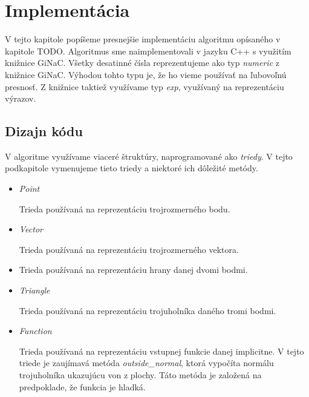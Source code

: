 \chapter{Implementácia}
\label{kap:implemetation}

V tejto kapitole popíšeme presnejšie implementáciu algoritmu opísaného v kapitole TODO.
Algoritmus sme naimplementovali v jazyku C++ s využitím knižnice GiNaC. Všetky desatinné čísla
reprezentujeme ako typ \textit{numeric} z knižnice GiNaC. Výhodou tohto typu je, že ho vieme 
používať na ľubovoľnú presnosť. Z knižnice taktiež využívame typ \textit{exp}, využívaný na 
reprezentáciu výrazov.

\section{Dizajn kódu}

V algoritme využívame viaceré štruktúry, naprogramované ako \textit{triedy}. V tejto podkapitole
vymenujeme tieto triedy a niektoré ich dôležité metódy.

\begin{itemize}
    \item{
        \textit{Point}

        Trieda používaná na reprezentáciu trojrozmerného bodu.
    }
    \item{
        \textit{Vector}
        
        Trieda používaná na reprezentáciu trojrozmerného vektora. 
    }
    \item{

        Trieda používaná na reprezentáciu hrany danej dvomi bodmi.
    }
    \item{
        \textit{Triangle}

        Trieda používaná na reprezentáciu trojuholníka daného tromi bodmi.
    }
    \item{
        \textit{Function}

        Trieda používaná na reprezentáciu vstupnej funkcie danej implicitne.
        V tejto triede je zaujímavá metóda \textit{outside_normal}, ktorá
        vypočíta normálu trojuholníka ukazujúcu von z plochy. Táto metóda
        je založená na predpoklade, že funkcia je hladká.
    }
\end{itemize}